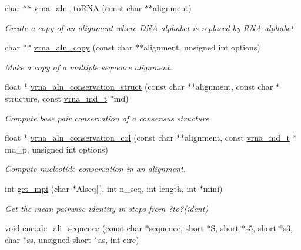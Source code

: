 \begin{DoxyCompactItemize}
char $\ast$$\ast$ \hyperlink{group__aln__utils_ga7886fc678553c06472a712a335cde9cf}{vrna\+\_\+aln\+\_\+to\+R\+NA} (const char $\ast$$\ast$alignment)
\begin{DoxyCompactList}\small\item\em Create a copy of an alignment where D\+NA alphabet is replaced by R\+NA alphabet. \end{DoxyCompactList}\item 
char $\ast$$\ast$ \hyperlink{group__aln__utils_ga08cdca592461436860daf9738279ce17}{vrna\+\_\+aln\+\_\+copy} (const char $\ast$$\ast$alignment, unsigned int options)
\begin{DoxyCompactList}\small\item\em Make a copy of a multiple sequence alignment. \end{DoxyCompactList}\item 
float $\ast$ \hyperlink{group__aln__utils_gab6f16a2ea93f3bfd4d089cc8d448bb16}{vrna\+\_\+aln\+\_\+conservation\+\_\+struct} (const char $\ast$$\ast$alignment, const char $\ast$structure, const \hyperlink{group__model__details_ga1f8a10e12a0a1915f2a4eff0b28ea17c}{vrna\+\_\+md\+\_\+t} $\ast$md)
\begin{DoxyCompactList}\small\item\em Compute base pair conservation of a consensus structure. \end{DoxyCompactList}\item 
float $\ast$ \hyperlink{group__aln__utils_gaa12b481a7e7b965ef2eb1bcc4399e759}{vrna\+\_\+aln\+\_\+conservation\+\_\+col} (const char $\ast$$\ast$alignment, const \hyperlink{group__model__details_ga1f8a10e12a0a1915f2a4eff0b28ea17c}{vrna\+\_\+md\+\_\+t} $\ast$md\+\_\+p, unsigned int options)
\begin{DoxyCompactList}\small\item\em Compute nucleotide conservation in an alignment. \end{DoxyCompactList}\item 
int \hyperlink{group__aln__utils_gaa2d600be90844094ec145ea14a314d2f}{get\+\_\+mpi} (char $\ast$Alseq\mbox{[}$\,$\mbox{]}, int n\+\_\+seq, int length, int $\ast$mini)
\begin{DoxyCompactList}\small\item\em Get the mean pairwise identity in steps from ?to?(ident) \end{DoxyCompactList}\item 
void \hyperlink{group__aln__utils_gaa3e40277c837d6f7603afe319884c786}{encode\+\_\+ali\+\_\+sequence} (const char $\ast$sequence, short $\ast$S, short $\ast$s5, short $\ast$s3, char $\ast$ss, unsigned short $\ast$as, int \hyperlink{group__model__details_gaf9202a1a09f5828dc731e2d9a10fa111}{circ})

\end{DoxyCompactItemize}
